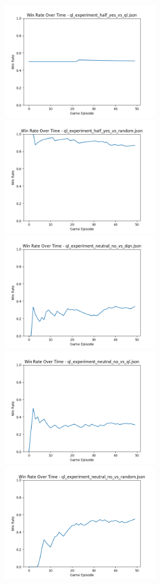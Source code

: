 \includegraphics[width=0.5\textwidth]{images/win_rate_ql_experiment_half_yes_vs_ql.png} 
\includegraphics[width=0.5\textwidth]{images/win_rate_ql_experiment_half_yes_vs_random.png} 
\includegraphics[width=0.5\textwidth]{images/win_rate_ql_experiment_neutral_no_vs_dqn.png} 
\includegraphics[width=0.5\textwidth]{images/win_rate_ql_experiment_neutral_no_vs_ql.png} 
\includegraphics[width=0.5\textwidth]{images/win_rate_ql_experiment_neutral_no_vs_random.png} 
